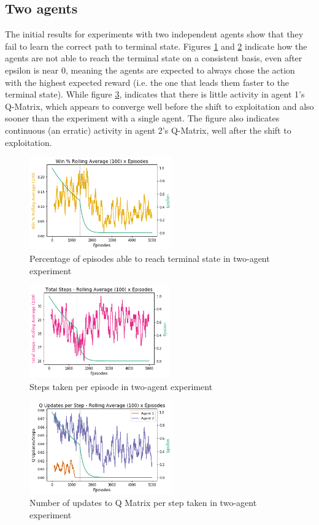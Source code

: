 \documentclass[11pt]{article}
\begin{document}
\subsection{Two agents}
The initial results for experiments with two independent agents show that they fail to learn the correct path to terminal state. Figures \ref{fig:exp2:win_percent} and \ref{fig:exp2:steps} indicate how the agents are not able to reach the terminal state on a consistent basis, even after epsilon is near 0, meaning the agents are expected to always chose the action with the highest expected reward (i.e. the one that leads them faster to the terminal state). While figure \ref{fig:exp2:updates}, indicates that  there is little activity in agent 1's Q-Matrix, which appears to converge well before the shift to exploitation and also sooner than the experiment with a single agent. The figure also indicates continuous (an erratic) activity in agent 2's Q-Matrix, well after the shift to exploitation.
\begin{figure}[h]
    \includegraphics[height=4cm]{Images/exp_2/1_win_percent.png}
    \caption{Percentage of episodes able to reach terminal state in two-agent experiment}
    \label{fig:exp2:win_percent}
\end{figure}
\begin{figure}[h]
    \includegraphics[height=4cm]{Images/exp_2/2_total_steps.png}
    \caption{Steps taken per episode in two-agent experiment}
    \label{fig:exp2:steps}
\end{figure}
\begin{figure}[h]
    \includegraphics[height=4cm]{Images/exp_2/3_updates_per_step.png}
    \caption{Number of updates to Q Matrix per step taken in two-agent experiment}
    \label{fig:exp2:updates}
\end{figure}
\end{document}

